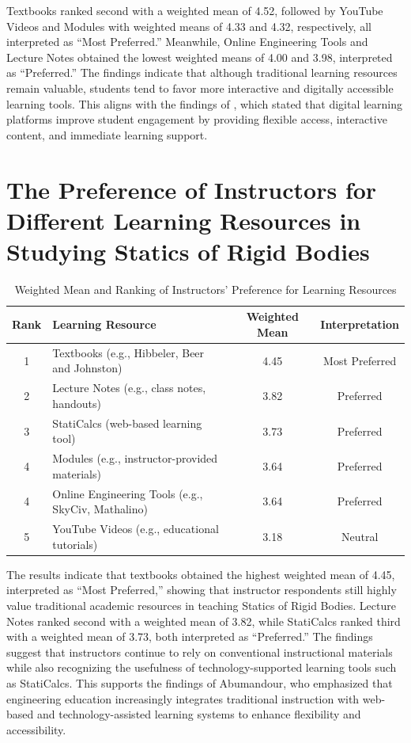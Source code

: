 Textbooks ranked second with a weighted mean of 4.52, followed by YouTube Videos and Modules with weighted means of 4.33 and 4.32, respectively, all interpreted as ``Most Preferred.'' Meanwhile, Online Engineering Tools and Lecture Notes obtained the lowest weighted means of 4.00 and 3.98, interpreted as ``Preferred.'' The findings indicate that although traditional learning resources remain valuable, students tend to favor more interactive and digitally accessible learning tools. This aligns with the findings of \cite{pedraza_assessing_2025}, which stated that digital learning platforms improve student engagement by providing flexible access, interactive content, and immediate learning support.



\section{The Preference of Instructors for Different Learning Resources in Studying Statics of Rigid Bodies}

\begin{table}[H]
\centering
\caption{Weighted Mean and Ranking of Instructors’ Preference for Learning Resources}
\renewcommand{\arraystretch}{1.3}
\begin{tabular}{c p{6cm} c c}
\hline
\textbf{Rank} & \textbf{Learning Resource} & \textbf{Weighted Mean} & \textbf{Interpretation} \\
\hline
1 & Textbooks (e.g., Hibbeler, Beer and Johnston) & 4.45 & Most Preferred \\
2 & Lecture Notes (e.g., class notes, handouts) & 3.82 & Preferred \\
3 & StatiCalcs (web-based learning tool) & 3.73 & Preferred \\
4 & Modules (e.g., instructor-provided materials) & 3.64 & Preferred \\
4 & Online Engineering Tools (e.g., SkyCiv, Mathalino) & 3.64 & Preferred \\
5 & YouTube Videos (e.g., educational tutorials) & 3.18 & Neutral \\
\hline
\end{tabular}
\end{table}

The results indicate that textbooks obtained the highest weighted mean of 4.45, interpreted as ``Most Preferred,'' showing that instructor respondents still highly value traditional academic resources in teaching Statics of Rigid Bodies. Lecture Notes ranked second with a weighted mean of 3.82, while StatiCalcs ranked third with a weighted mean of 3.73, both interpreted as ``Preferred.'' The findings suggest that instructors continue to rely on conventional instructional materials while also recognizing the usefulness of technology-supported learning tools such as StatiCalcs. This supports the findings of Abumandour, who emphasized that engineering education increasingly integrates traditional instruction with web-based and technology-assisted learning systems to enhance flexibility and accessibility.

